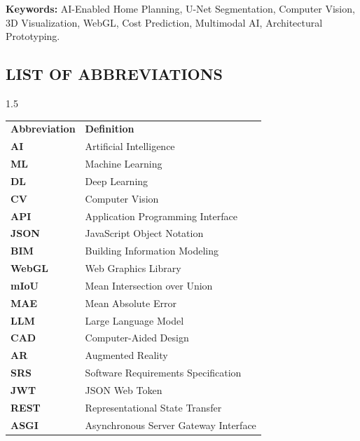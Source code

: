 \documentclass[12pt]{report}
\begin{document}
\textbf{Keywords:} AI-Enabled Home Planning, U-Net Segmentation, Computer Vision, 3D Visualization, WebGL, Cost Prediction, Multimodal AI, Architectural Prototyping.



\tableofcontents
\newpage
\listoffigures
\newpage
\listoftables

\begin{center}
\chapter*{LIST OF ABBREVIATIONS}

\begin{spacing}{1.5}                        %
\begin{tabular}{p{4cm} p{10cm}} 
\textbf{Abbreviation} & \textbf{Definition} \\
\textbf{AI} & Artificial Intelligence \\
\textbf{ML} & Machine Learning \\
\textbf{DL} & Deep Learning \\
\textbf{CV} & Computer Vision \\
\textbf{API} & Application Programming Interface \\
\textbf{JSON} & JavaScript Object Notation \\
\textbf{BIM} & Building Information Modeling \\
\textbf{WebGL} & Web Graphics Library \\
\textbf{mIoU} & Mean Intersection over Union \\
\textbf{MAE} & Mean Absolute Error \\
\textbf{LLM} & Large Language Model \\
\textbf{CAD} & Computer-Aided Design \\
\textbf{AR} & Augmented Reality \\
\textbf{SRS} & Software Requirements Specification \\
\textbf{JWT} & JSON Web Token \\
\textbf{REST} & Representational State Transfer \\
\textbf{ASGI} & Asynchronous Server Gateway Interface \\
\end{tabular}
\end{spacing}
\end{center}
\end{document}
